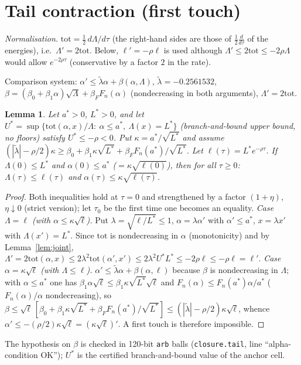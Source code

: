 \documentclass[11pt]{article}
\newtheorem{lemma}{Lemma}
\theoremstyle{definition}
\newcommand{\Ly}{\Lambda}
\newcommand{\tot}{\mathrm{tot}}
\begin{document}
\section{Tail contraction (first touch)}
\emph{Normalisation.} $\tot=\tfrac12\,d\Ly/d\tau$ (the right-hand sides are those of $\tfrac12\frac{d}{d\tau}$ of the energies), i.e.\ $\Ly'=2\tot$. Below, $\ell'=-\rho\ell$ is used although $\Ly'\le2\tot\le-2\rho\Ly$ would allow $e^{-2\rho\tau}$ (conservative by a factor $2$ in the rate).

Comparison system: $\alpha'\le\tilde\lambda\alpha+\beta(\alpha,\Ly)$, $\tilde\lambda=-0.2561532$, $\beta=(\beta_0+\beta_1\alpha)\sqrt\Ly+\beta_FF_n(\alpha)$ (nondecreasing in both arguments), $\Ly'=2\tot$.
\begin{lemma}\label{lem:tail} Let $a^*>0$, $L^*>0$, and let $U^*=\sup\{\tot(\alpha,x)/\Ly:\ \alpha\le a^*,\ \Ly(x)=L^*\}$ (branch-and-bound upper bound, no floors) satisfy $U^*\le-\rho<0$. Put $\kappa=a^*/\sqrt{L^*}$ and assume
$(|\tilde\lambda|-\rho/2)\kappa\ge\beta_0+\beta_1\kappa\sqrt{L^*}+\beta_FF_n(a^*)/\sqrt{L^*}$. Let $\ell(\tau)=L^*e^{-\rho\tau}$. If $\Ly(0)\le L^*$ and $\alpha(0)\le a^*$ ($=\kappa\sqrt{\ell(0)}$), then for all $\tau\ge0$: $\Ly(\tau)\le\ell(\tau)$ and $\alpha(\tau)\le\kappa\sqrt{\ell(\tau)}$.
\end{lemma}
\begin{proof} Both inequalities hold at $\tau=0$ and strengthened by a factor $(1+\eta)$, $\eta\downarrow0$ (strict version); let $\tau_0$ be the first time one becomes an equality. 
\emph{Case $\Ly=\ell$ (with $\alpha\le\kappa\sqrt\ell$).} Put $\lambda=\sqrt{\ell/L^*}\le1$, $\alpha=\lambda\alpha'$ with $\alpha'\le a^*$, $x=\lambda x'$ with $\Ly(x')=L^*$. Since $\tot$ is nondecreasing in $\alpha$ (monotonicity) and by Lemma~\ref{lem:joint}, $\Ly'=2\tot(\alpha,x)\le2\lambda^2\tot(\alpha',x')\le2\lambda^2U^*L^*\le-2\rho\ell\le-\rho\ell=\ell'$.
\emph{Case $\alpha=\kappa\sqrt\ell$ (with $\Ly\le\ell$).} $\alpha'\le\tilde\lambda\alpha+\beta(\alpha,\ell)$ because $\beta$ is nondecreasing in $\Ly$; with $\alpha\le a^*$ one has $\beta_1\alpha\sqrt\ell\le\beta_1\kappa\sqrt{L^*}\sqrt\ell$ and $F_n(\alpha)\le F_n(a^*)\alpha/a^*$ ($F_n(\alpha)/\alpha$ nondecreasing), so $\beta\le\sqrt\ell\,[\beta_0+\beta_1\kappa\sqrt{L^*}+\beta_FF_n(a^*)/\sqrt{L^*}]\le(|\tilde\lambda|-\rho/2)\kappa\sqrt\ell$, whence $\alpha'\le-(\rho/2)\kappa\sqrt\ell=(\kappa\sqrt\ell)'$. A first touch is therefore impossible.\end{proof}
The hypothesis on $\beta$ is checked in 120-bit \texttt{arb} balls (\texttt{closure.tail}, line ``alpha-condition OK''); $U^*$ is the certified branch-and-bound value of the anchor cell.
\end{document}
